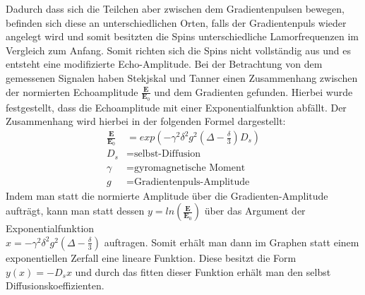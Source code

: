 Dadurch dass sich die Teilchen aber zwischen dem Gradientenpulsen bewegen, befinden sich diese an unterschiedlichen Orten, falls der Gradientenpuls wieder angelegt wird und somit besitzten die Spins unterschiedliche Lamorfrequenzen im Vergleich zum Anfang.
Somit richten sich die Spins nicht vollständig aus und es entsteht eine modifizierte Echo-Amplitude.
Bei der Betrachtung von dem gemessenen Signalen haben Stekjskal und Tanner einen Zusammenhang zwischen der normierten Echoamplitude $\frac{\textbf{E}}{\textbf{E}_0}$ und dem Gradienten gefunden. Hierbei wurde festgestellt, dass die Echoamplitude mit einer Exponentialfunktion abfällt. Der Zusammenhang wird hierbei in der folgenden Formel dargestellt:
\begin{align}
    \frac{\textbf{E}}{\textbf{E}_0}&=exp\left(-\gamma^2\delta^2g^2\left(\Delta-\frac{\delta}{3}\right)D_s\right)\\
    D_s&=\text{selbst-Diffusion}\\
    \gamma&= \text{gyromagnetische Moment}\\
    g &= \text{Gradientenpuls-Amplitude}
\end{align}
Indem man statt die normierte Amplitude über die Gradienten-Amplitude aufträgt, kann man statt dessen $y=ln\left(\frac{\textbf{E}}{\textbf{E}_0}\right)$ über  das Argument der Exponentialfunktion\\
 $x= -\gamma^2\delta^2g^2\left(\Delta-\frac{\delta}{3}\right)$ auftragen. Somit erhält man dann im Graphen statt einem exponentiellen Zerfall eine lineare Funktion. Diese besitzt die Form $y(x)=-D_sx$ und durch das fitten dieser Funktion erhält man den selbst Diffusionskoeffizienten.       

